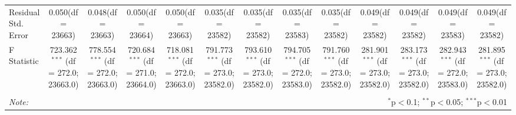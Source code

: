 \begin{table}[!htbp]
\begin{tabular}{@{\extracolsep{5pt}}lcccccccccccc}
 Residual Std. Error & 0.050(df = 23663) & 0.048(df = 23663) & 0.050(df = 23664) & 0.050(df = 23663) & 0.035(df = 23582) & 0.035(df = 23582) & 0.035(df = 23583) & 0.035(df = 23582) & 0.049(df = 23582) & 0.049(df = 23582) & 0.049(df = 23583) & 0.049(df = 23582)  \\
 F Statistic & 723.362$^{***}$ (df = 272.0; 23663.0) & 778.554$^{***}$ (df = 272.0; 23663.0) & 720.684$^{***}$ (df = 271.0; 23664.0) & 718.081$^{***}$ (df = 272.0; 23663.0) & 791.773$^{***}$ (df = 273.0; 23582.0) & 793.610$^{***}$ (df = 273.0; 23582.0) & 794.705$^{***}$ (df = 272.0; 23583.0) & 791.760$^{***}$ (df = 273.0; 23582.0) & 281.901$^{***}$ (df = 273.0; 23582.0) & 283.173$^{***}$ (df = 273.0; 23582.0) & 282.943$^{***}$ (df = 272.0; 23583.0) & 281.895$^{***}$ (df = 273.0; 23582.0) \\
\hline
\hline \\[-1.8ex]
\textit{Note:} & \multicolumn{12}{r}{$^{*}$p$<$0.1; $^{**}$p$<$0.05; $^{***}$p$<$0.01} \\
\end{tabular}
\end{table}
